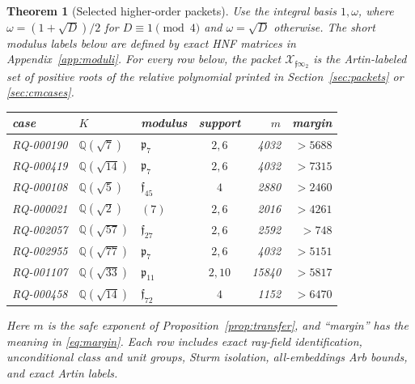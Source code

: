 \documentclass[11pt]{article}
\newtheorem{theorem}{Theorem}
\newcommand{\Q}{\mathbb Q}
\begin{document}
\begin{theorem}[Selected higher-order packets]\label{thm:main}
Use the integral basis \(1,\omega\), where
\(\omega=(1+\sqrt D)/2\) for \(D\equiv1\pmod4\) and
\(\omega=\sqrt D\) otherwise.  The short modulus labels below are
defined by exact HNF matrices in Appendix~\ref{app:moduli}.  For every row below,
the packet \(\mathcal X_{\mathfrak f\infty_2}\) is the Artin-labeled
set of positive roots of the relative polynomial printed in
Section~\ref{sec:packets} or \ref{sec:cmcases}.
\begin{center}\footnotesize
\begin{tabular}{@{}lllcrr@{}}
\toprule
case & \(K\) & modulus & support
 & \(m\) & margin\\
\midrule
RQ-000190 & \(\Q(\sqrt7)\) &
\(\mathfrak p_7\)&
\(2,6\)&4032&\(>5688\)\\
RQ-000419 & \(\Q(\sqrt{14})\) &
\(\mathfrak p_7\)&
\(2,6\)&4032&\(>7315\)\\
RQ-000108 & \(\Q(\sqrt5)\) &
\(\mathfrak f_{45}\)&
\(4\)&2880&\(>2460\)\\
RQ-000021 & \(\Q(\sqrt2)\) &
\((7)\)&
\(2,6\)&2016&\(>4261\)\\
RQ-002057 & \(\Q(\sqrt{57})\) &
\(\mathfrak f_{27}\)&
\(2,6\)&2592&\(>748\)\\
RQ-002955 & \(\Q(\sqrt{77})\) &
\(\mathfrak p_7\)&
\(2,6\)&4032&\(>5151\)\\
RQ-001107 & \(\Q(\sqrt{33})\) &
\(\mathfrak p_{11}\)&
\(2,10\)&15840&\(>5817\)\\
RQ-000458 & \(\Q(\sqrt{14})\) &
\(\mathfrak f_{72}\)&
\(4\)&1152&\(>6470\)\\
\bottomrule
\end{tabular}
\end{center}
Here \(m\) is the safe exponent of
Proposition~\ref{prop:transfer}, and ``margin'' has the meaning in
\eqref{eq:margin}.  Each row includes exact ray-field identification, unconditional
class and unit groups, Sturm isolation, all-embeddings Arb bounds, and
exact Artin labels.
\end{theorem}
\end{document}
